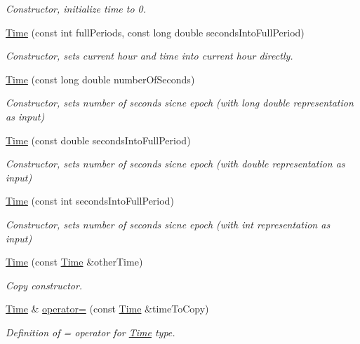 \begin{DoxyCompactItemize}
\begin{DoxyCompactList}\small\item\em Constructor, initialize time to 0. \end{DoxyCompactList}\item 
\hyperlink{classtudat_1_1Time_afbf3067a4bdb2fb876510c1f0ef55ce1}{Time} (const int full\+Periods, const long double seconds\+Into\+Full\+Period)
\begin{DoxyCompactList}\small\item\em Constructor, sets current hour and time into current hour directly. \end{DoxyCompactList}\item 
\hyperlink{classtudat_1_1Time_a9c7aa5e82b116e94dab3f825ce257d76}{Time} (const long double number\+Of\+Seconds)
\begin{DoxyCompactList}\small\item\em Constructor, sets number of seconds sicne epoch (with long double representation as input) \end{DoxyCompactList}\item 
\hyperlink{classtudat_1_1Time_a624d20b7623b8b740f86f3c996898436}{Time} (const double seconds\+Into\+Full\+Period)
\begin{DoxyCompactList}\small\item\em Constructor, sets number of seconds sicne epoch (with double representation as input) \end{DoxyCompactList}\item 
\hyperlink{classtudat_1_1Time_ac7cf36cf588e9da9b781a73502f87624}{Time} (const int seconds\+Into\+Full\+Period)
\begin{DoxyCompactList}\small\item\em Constructor, sets number of seconds sicne epoch (with int representation as input) \end{DoxyCompactList}\item 
\hyperlink{classtudat_1_1Time_a0c34007af7e49b34a3a7230f880ac1e5}{Time} (const \hyperlink{classtudat_1_1Time}{Time} \&other\+Time)
\begin{DoxyCompactList}\small\item\em Copy constructor. \end{DoxyCompactList}\item 
\hyperlink{classtudat_1_1Time}{Time} \& \hyperlink{classtudat_1_1Time_aedcbd640c627656d49b1184c130c2bd2}{operator=} (const \hyperlink{classtudat_1_1Time}{Time} \&time\+To\+Copy)
\begin{DoxyCompactList}\small\item\em Definition of = operator for \hyperlink{classtudat_1_1Time}{Time} type. \end{DoxyCompactList}\item 

\end{DoxyCompactItemize}
